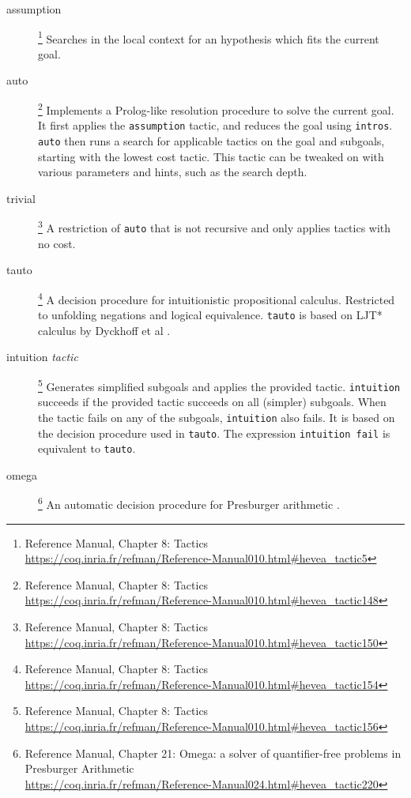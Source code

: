 \begin{description}
\item[assumption]
  \footnote{
    \coq Reference Manual, Chapter 8:
    Tactics\\
    \url{https://coq.inria.fr/refman/Reference-Manual010.html\#hevea_tactic5}
  }
  Searches in the local context for an hypothesis which fits the current goal.
\item[auto]
  \footnote{
    \coq Reference Manual, Chapter 8:
    Tactics\\
    \url{https://coq.inria.fr/refman/Reference-Manual010.html\#hevea_tactic148}
  }
  Implements a Prolog-like resolution procedure to solve the current goal.
  It first applies the \texttt{assumption} tactic, and reduces the goal using \texttt{intros}.
  \texttt{auto} then runs a search for applicable tactics on the goal and subgoals, starting with the lowest cost tactic.
  This tactic can be tweaked on with various parameters and hints, such as the search depth.
\item[trivial]
  \footnote{
    \coq Reference Manual, Chapter 8:
    Tactics\\
    \url{https://coq.inria.fr/refman/Reference-Manual010.html\#hevea_tactic150}
  }
  A restriction of \texttt{auto} that is not recursive and only applies tactics with no cost.
\item[tauto]
  \footnote{
    \coq Reference Manual, Chapter 8:
    Tactics\\
    \url{https://coq.inria.fr/refman/Reference-Manual010.html\#hevea_tactic154}
  }
  A decision procedure for intuitionistic propositional calculus.
  Restricted to unfolding negations and logical equivalence.
  \texttt{tauto} is based on LJT* calculus by Dyckhoff et al \cite{dyckhoff1992contraction}.
\item[intuition \emph{tactic}]
  \footnote{
    \coq Reference Manual, Chapter 8:
    Tactics\\
    \url{https://coq.inria.fr/refman/Reference-Manual010.html\#hevea_tactic156}
  }
  Generates simplified subgoals and applies the provided tactic.
  \texttt{intuition} succeeds if the provided tactic succeeds on all (simpler) subgoals.
  When the tactic fails on any of the subgoals, \texttt{intuition} also fails.
  It is based on the decision procedure used in \texttt{tauto}.
  The expression \texttt{intuition fail} is equivalent to \texttt{tauto}.
\item[omega]
  \footnote{
    \coq Reference Manual, Chapter 21:
    Omega: a solver of quantifier-free problems in Presburger Arithmetic\\
    \url{https://coq.inria.fr/refman/Reference-Manual024.html\#hevea_tactic220}
  }
  An automatic decision procedure for Presburger arithmetic \cite{stansifer1984presburger}.
\end{description}

